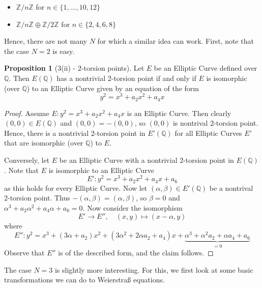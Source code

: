 \documentclass{scrartcl}
\newcommand{\Z}{\mathbb{Z}}
\newcommand{\Q}{\mathbb{Q}}
\theoremstyle{definition}
\newtheorem{prop}[subsection]{Proposition}
\begin{document}
\begin{itemize}
    \item $\Z/n\Z$ for $n \in \{ 1, ..., 10, 12 \}$
    \item $\Z/n\Z \oplus \Z/2\Z$ for $n \in \{ 2, 4, 6, 8 \}$
\end{itemize}
Hence, there are not many $N$ for which a similar idea can work.
First, note that the case $N = 2$ is easy.
\begin{prop}[3(ii) - $2$-torsion points]
    Let $E$ be an Elliptic Curve defined over $\Q$.
    Then $E(\Q)$ has a nontrivial 2-torsion point if and only if $E$ is isomorphic (over $\Q$) to an Elliptic Curve given by an equation of the form
    \begin{equation*}
        y^2 = x^3 + a_2 x^2 + a_4 x
    \end{equation*}
\end{prop}
\begin{proof}
    Assume $E: y^2 = x^3 + a_2 x^2 + a_4 x$ is an Elliptic Curve.
    Then clearly $(0, 0) \in E(\Q)$ and $(0, 0) = -(0, 0)$, so $(0, 0)$ is nontrival 2-torsion point.
    Hence, there is a nontrivial 2-torsion point in $E'(\Q)$ for all Elliptic Curves $E'$ that are isomorphic (over $\Q$) to $E$.

    Conversely, let $E$ be an Elliptic Curve with a nontrivial 2-torsion point in $E(\Q)$.
    Note that $E$ is isomorphic to an Elliptic Curve 
    \begin{equation*}
        E': y^2 = x^3 + a_2 x^2 + a_4 x + a_6
    \end{equation*}
    as this holds for every Elliptic Curve.
    Now let $(\alpha, \beta) \in E'(\Q)$ be a nontrival 2-torsion point.
    Thus $-(\alpha, \beta) = (\alpha, \beta)$, so $\beta = 0$ and $\alpha^3 + a_2 \alpha^2 + a_4 \alpha + a_6 = 0$.
    Now consider the isomorphism
    \begin{equation*}
        E' \to E'', \quad (x, y) \mapsto (x - \alpha, y)
    \end{equation*}
    where
    \begin{equation*}
        E'': y^2 = x^3 + (3\alpha + a_2) x^2 + (3\alpha^2 + 2\alpha a_2 + a_4)x + \underbrace{\alpha^3 + \alpha^2a_2 + \alpha a_4 + a_6}_{= 0}
    \end{equation*}
    Observe that $E''$ is of the described form, and the claim follows. 
\end{proof}
The case $N = 3$ is slightly more interesting.
For this, we first look at some basic transformations we can do to Weierstraß equations.
\end{document}
